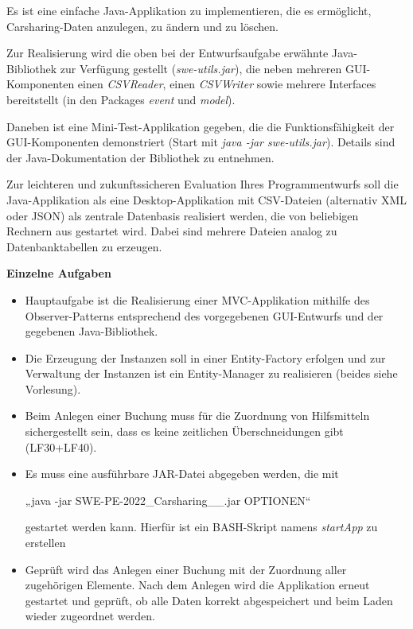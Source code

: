 Es ist eine einfache Java-Applikation zu implementieren, die es ermöglicht, Carsharing-Daten anzulegen, zu ändern und zu löschen.  

Zur Realisierung wird die oben bei der Entwurfsaufgabe erwähnte Java-Bibliothek zur Verfügung gestellt (\emph{swe-utils.jar}), die neben mehreren GUI-Komponenten einen \emph{CSVReader}, einen \emph{CSVWriter} sowie mehrere Interfaces bereitstellt (in den Packages \emph{event} und \emph{model}).  

Daneben ist eine Mini-Test-Applikation gegeben, die die Funktionsfähigkeit der GUI-Komponenten demonstriert (Start mit \emph{java -jar swe-utils.jar}). Details sind der Java-Dokumentation der Bibliothek zu entnehmen. 

Zur leichteren und zukunftssicheren Evaluation Ihres Programmentwurfs soll die Java-Applikation als eine Desktop-Applikation mit CSV-Dateien (alternativ XML oder JSON) als zentrale Datenbasis realisiert werden, die von beliebigen Rechnern aus gestartet wird. Dabei sind mehrere Dateien analog zu Datenbanktabellen zu erzeugen. 

\textbf{Einzelne Aufgaben}

\begin{itemize}
    \item Hauptaufgabe ist die Realisierung einer MVC-Applikation mithilfe des Observer-Patterns entsprechend des vorgegebenen GUI-Entwurfs und der gegebenen Java-Bibliothek. 
    \item Die Erzeugung der Instanzen soll in einer Entity-Factory erfolgen und zur Verwaltung der Instanzen ist ein Entity-Manager zu realisieren (beides siehe Vorlesung). 
    \item Beim Anlegen einer Buchung muss für die Zuordnung von Hilfsmitteln sichergestellt sein, dass es keine zeitlichen Überschneidungen gibt (LF30+LF40).
    \item Es muss eine ausführbare JAR-Datei abgegeben werden, die mit 

    „java -jar SWE-PE-2022\_Carsharing\_<name1>\_<name2>.jar OPTIONEN“  

    gestartet werden kann. Hierfür ist ein BASH-Skript namens \emph{startApp} zu erstellen
    \item Geprüft wird das Anlegen einer Buchung mit der Zuordnung aller zugehörigen Elemente. Nach dem Anlegen wird die Applikation erneut gestartet und geprüft, ob alle Daten korrekt abgespeichert und beim Laden wieder zugeordnet werden.
\end{itemize}

